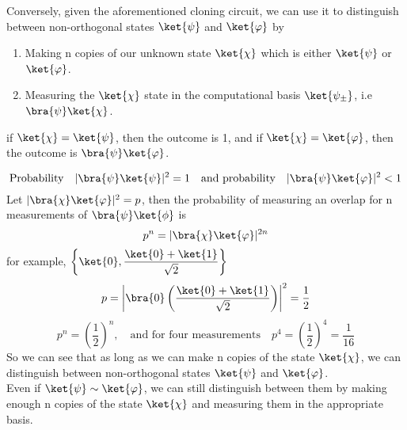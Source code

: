 \documentclass[12 pt]{article}
\begin{document}
Conversely, given the aforementioned cloning circuit, we can use it to distinguish between non-orthogonal states $\ket{\psi}$ and $\ket{\varphi}$ by

\begin{enumerate}
  \item Making n copies of our unknown state $\ket{\chi}$ which is either $\ket{\psi}$ or $\ket{\varphi}$. 
  \item Measuring the $\ket{\chi}$ state in the computational basis $\ket{\psi_{\pm}}$, i.e $\bra{\psi}\ket{\chi}$.
\end{enumerate}
if $\ket{\chi} = \ket{\psi}$, then the outcome is 1, and if $\ket{\chi} = \ket{\varphi}$, then the outcome is $\bra{\psi}\ket{\varphi}$.

\[
\text{Probability} \quad | \bra{\psi}\ket{\psi} |^2 = 1 \quad \text{and probability} \quad | \bra{\psi}\ket{\varphi} |^2 < 1
\]
Let $|\bra{\chi}\ket{\varphi}|^2 = p$, then the probability of measuring an overlap for n measurements of $\bra{\psi}\ket{\phi}$ is  
\[
p^n  = |\bra{\chi}\ket{\varphi}|^{2n}
\]
for example, $\displaystyle{\left \{ \ket{0}, \frac{\ket{0} + \ket{1}}{\sqrt{2}} \right\}}$
\[
p = \left| \bra{0} \left( \frac{\ket{0} + \ket{1}}{\sqrt{2}} \right) \right|^2 = \frac{1}{2}
\]
\[
p^n = \left( \frac{1}{2} \right)^n, \quad \text{and for four measurements} \quad p^4 = \left( \frac{1}{2} \right)^4 = \frac{1}{16}
\]
So we can see that as long as we can make n copies of the state $\ket{\chi}$, we can distinguish between non-orthogonal states $\ket{\psi}$ and $\ket{\varphi}$.\\

Even if $\ket{\psi}\sim \ket{\varphi}$, we can still distinguish between them by making enough n copies of the state $\ket{\chi}$ and measuring them in the appropriate 
basis.\\
\end{document}
